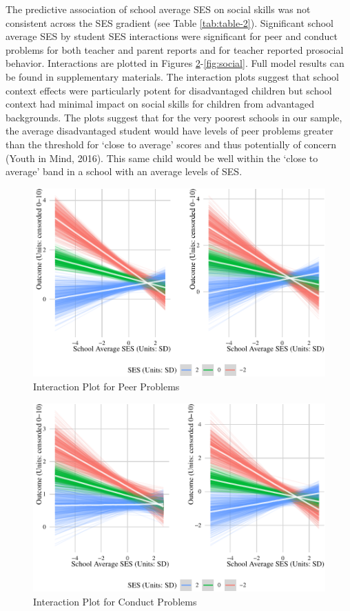 \documentclass[
  english,
  man]{apa6}
\begin{document}
The predictive association of school average SES on social skills was not consistent across the SES gradient (see Table \ref{tab:table-2}). Significant school average SES by student SES interactions were significant for peer and conduct problems for both teacher and parent reports and for teacher reported prosocial behavior. Interactions are plotted in Figures \ref{fig:conduct}-\ref{fig:social}. Full model results can be found in supplementary materials. The interaction plots suggest that school context effects were particularly potent for disadvantaged children but school context had minimal impact on social skills for children from advantaged backgrounds. The plots suggest that for the very poorest schools in our sample, the average disadvantaged student would have levels of peer problems greater than the threshold for `close to average' scores and thus potentially of concern (Youth in Mind, 2016). This same child would be well within the `close to average' band in a school with an average levels of SES.

\begin{figure}
\centering
\includegraphics{manuscript_files/figure-latex/peer-1.pdf}
\caption{\label{fig:peer}Interaction Plot for Peer Problems}
\end{figure}

\begin{figure}
\centering
\includegraphics{manuscript_files/figure-latex/conduct-1.pdf}
\caption{\label{fig:conduct}Interaction Plot for Conduct Problems}
\end{figure}
\end{document}
